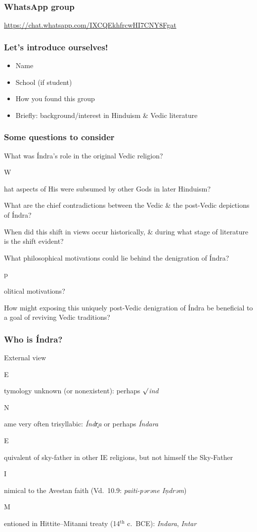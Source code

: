 \documentclass[pdf]{beamer}
\newcommand{\Subitem}[1]{{\setlength\itemindent{12pt} \item[-] #1}}
\begin{document}
\begin{frame} \frametitle{WhatsApp group}
\begin{center}
	\href{https://chat.whatsapp.com/IXCQEkhfrcwHI7CNY8Fgat}{https://chat.whatsapp.com/IXCQEkhfrcwHI7CNY8Fgat}
\end{center}
\end{frame}

\begin{frame} \frametitle{Let's introduce ourselves!}
\begin{itemize}
	\item Name
	\item School (if student)
	\item How you found this group
	\item Briefly: background/interest in Hinduism \& Vedic literature
\end{itemize}
\end{frame}

\begin{frame}[label=questions] \frametitle{Some questions to consider}
\begin{itemize}
	\item What was Índra's role in the original Vedic religion?
	\Subitem What aspects of His were subsumed by other Gods in later Hinduism?
	\item What are the chief contradictions between the Vedic \& the post-Vedic depictions of Índra?
	\item When did this shift in views occur historically, \& during what stage of literature is the shift evident?
	\item What philosophical motivations could lie behind the denigration of Índra?
	\Subitem political motivations?
	\item How might exposing this uniquely post-Vedic denigration of Índra be beneficial to a goal of reviving Vedic traditions?
\end{itemize}
\end{frame}

\begin{frame} \frametitle{Who is Índra?}
\begin{itemize}
	\item External view
	\Subitem Etymology unknown (or nonexistent): perhaps $\surd$\textit{ind}
	\Subitem Name very often trisyllabic: \textit{Índr̥a} or perhaps \textit{Índara}
	\Subitem Equivalent of sky-father in other IE religions, but not himself the Sky-Father
	\Subitem Inimical to the Avestan faith (Vd.~10.9: \textit{paiti-pərəne Iṇdrəm})
	\Subitem Mentioned in Hittite--Mitanni treaty (14$^{\text{th}}$ c.~BCE): \textit{Indara}, \textit{Intar}
\end{itemize}
\end{frame}
\end{document}
